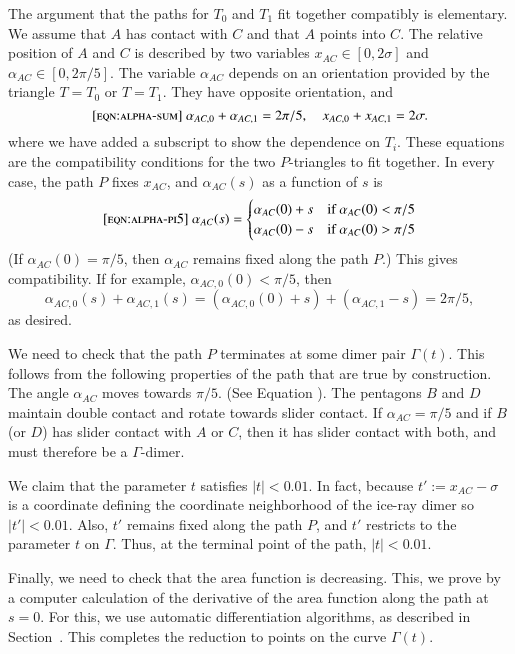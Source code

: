 The argument that the paths for $T_0$ and $T_1$ fit together compatibly is elementary.
We assume that $A$ has contact with $C$ and that $A$ points into $C$.
The relative position of $A$ and $C$ is described by two variables $x_{AC}\in[0,2\sigma]$ and 
$\alpha_{AC}\in[0,2\pi/5]$.
The variable $\alpha_{AC}$ depends on an orientation provided by the triangle $T=T_0$ or $T=T_1$.
They have opposite orientation, and 
\begin{equation}\libel{eqn:alpha-sum}
\alpha_{AC,0}+\alpha_{AC,1} = 2\pi/5,\quad x_{AC,0} + x_{AC,1} = 2\sigma.
\end{equation}
where we have added a subscript to show the dependence on $T_i$.  These equations are the
compatibility conditions for the two $P$-triangles to fit together.
In every case, the path $P$ fixes $x_{AC}$, and  $\alpha_{AC}(s)$ as a function of $s$ is
\begin{equation}\libel{eqn:alpha-pi5}
\alpha_{AC}(s) = 
\begin{cases}
\alpha_{AC}(0) + s&\text{if } \alpha_{AC}(0) < \pi/5\\
\alpha_{AC}(0) - s&\text{if } \alpha_{AC}(0) > \pi/5\\
\end{cases}
\end{equation}
(If $\alpha_{AC}(0) = \pi/5$, then $\alpha_{AC}$ remains fixed along the path $P$.)
This gives compatibility. If for example, $\alpha_{AC,0}(0) < \pi/5$, then
\[
\alpha_{AC,0}(s) + \alpha_{AC,1}(s) = (\alpha_{AC,0}(0) + s) + (\alpha_{AC,1} - s) = 2\pi/5,
\]
as desired.

We need to check that the path $P$ terminates at some dimer pair $\Gamma(t)$.  This follows from
the following properties of the path that are true by construction.  The angle $\alpha_{AC}$ moves
towards $\pi/5$. (See Equation ). The pentagons $B$ and $D$ maintain double contact
and rotate towards slider contact.   If $\alpha_{AC}=\pi/5$ and if $B$ (or $D$) has slider contact with $A$ or $C$,
then it has slider contact with both, and must therefore be a $\Gamma$-dimer.

We claim that the parameter $t$ satisfies $|t|<0.01$.  In fact, 
because $t' := x_{AC}-\sigma$ is a coordinate defining the
coordinate neighborhood of the ice-ray dimer so $|t'|<0.01$.  Also, $t'$ remains fixed along the path $P$,
and $t'$ restricts to the parameter $t$ on $\Gamma$.  Thus, at the terminal point of the path, $|t|<0.01$.

Finally, we need to check that the area function is decreasing. This, we prove by a computer calculation
of the derivative of the area function along the path at $s=0$.  For this, we use automatic differentiation algorithms,
as described in Section~.  This completes the reduction to points on the curve $\Gamma(t)$.



